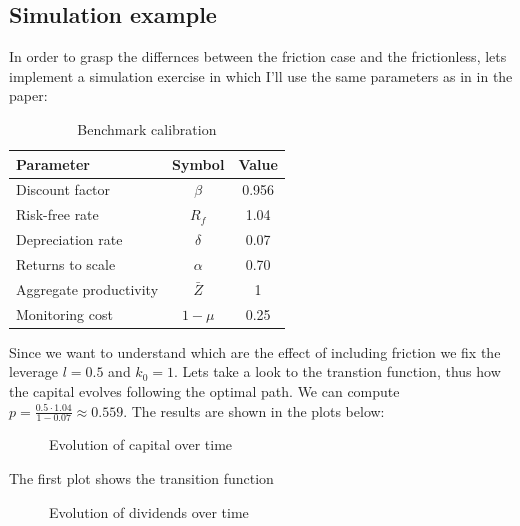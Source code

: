 \documentclass[12pt]{article}
\begin{document}
\subsection{Simulation example}
In order to grasp the differnces between the friction case and the frictionless, lets implement a simulation exercise in
which I'll use the same parameters as in in the \cite{OsePap17} paper:
\begin{table}
    \centering
    \begin{tabular}{lcc}
    \hline Parameter & Symbol & Value \\
    \hline \hline Discount factor & $\beta$ & 0.956 \\
    Risk-free rate & $R_f$ & 1.04 \\
    Depreciation rate & $\delta$ & 0.07 \\
    Returns to scale & $\alpha$ & 0.70 \\
    Aggregate productivity & $\bar{Z}$ & 1 \\
    Monitoring cost & $1-\mu$ & 0.25 \\
    \hline
    \end{tabular}
    \caption{Benchmark calibration}
\end{table}
Since we want to understand which are the effect of including friction we fix the leverage \(l=0.5\) and \(k_0=1\). Lets take a look
to the transtion function, thus how the capital evolves following the optimal path. 
We can compute \(p=\frac{0.5 \cdot 1.04}{1-0.07} \approx 
0.559 \). The results are shown in the plots below:
\begin{figure}[htbp]
    \centering
    \caption{Evolution of capital over time}
\end{figure}
The first plot shows the transition function 
\begin{figure}[htbp]
    \centering
    \caption{Evolution of dividends over time}
\end{figure}
\end{document}
